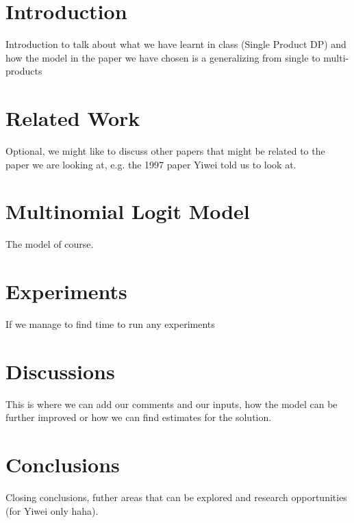 


\section{Introduction}
Introduction to talk about what we have learnt in class (Single Product DP) and how the model in the paper we have chosen is a generalizing from single to multi-products


\section{Related Work}
Optional, we might like to discuss other papers that might be related to the paper we are looking at, e.g. the 1997 paper Yiwei told us to look at.


\section{Multinomial Logit Model}
The model of course.


\section{Experiments}
If we manage to find time to run any experiments


\section{Discussions}
This is where we can add our comments and our inputs, how the model can be further improved or how we can find estimates for the solution. 


\section{Conclusions}
Closing conclusions, futher areas that can be explored and research opportunities (for Yiwei only haha).



